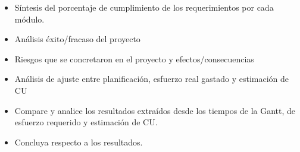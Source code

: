 \begin{itemize}
    \item Síntesis del porcentaje de cumplimiento de los requerimientos por cada módulo.
    \item Análisis éxito/fracaso del proyecto
    \item Riesgos que se concretaron en el proyecto y efectos/consecuencias
    \item Análisis de ajuste entre planificación, esfuerzo real gastado y estimación de CU
    \item Compare y analice los resultados extraídos desde los tiempos de la Gantt, de esfuerzo requerido y estimación de CU.
    \item Concluya respecto a los resultados.
\end{itemize}
